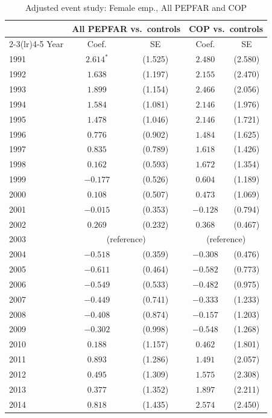 \begin{table}[htbp]
\centering
\small
\caption{Adjusted event study: Female emp., All PEPFAR and COP}
\label{tab:es_combined_emp_female}
\begin{tabular}{lcccc}
\toprule
 & \multicolumn{2}{c}{All PEPFAR vs.\ controls} & \multicolumn{2}{c}{COP vs.\ controls} \\
\cmidrule(lr){2-3}\cmidrule(lr){4-5}
Year & Coef. & SE & Coef. & SE \\
\midrule
1991 & $2.614^{*}$ & (1.525) & $2.480$ & (2.580) \\
1992 & $1.638$ & (1.197) & $2.155$ & (2.470) \\
1993 & $1.899$ & (1.154) & $2.466$ & (2.056) \\
1994 & $1.584$ & (1.081) & $2.146$ & (1.976) \\
1995 & $1.478$ & (1.046) & $2.146$ & (1.721) \\
1996 & $0.776$ & (0.902) & $1.484$ & (1.625) \\
1997 & $0.835$ & (0.789) & $1.618$ & (1.426) \\
1998 & $0.162$ & (0.593) & $1.672$ & (1.354) \\
1999 & $-0.177$ & (0.526) & $0.604$ & (1.189) \\
2000 & $0.108$ & (0.507) & $0.473$ & (1.069) \\
2001 & $-0.015$ & (0.353) & $-0.128$ & (0.794) \\
2002 & $0.269$ & (0.232) & $0.368$ & (0.467) \\
2003 & \multicolumn{2}{c}{(reference)} & \multicolumn{2}{c}{(reference)} \\
2004 & $-0.518$ & (0.359) & $-0.308$ & (0.476) \\
2005 & $-0.611$ & (0.464) & $-0.582$ & (0.773) \\
2006 & $-0.549$ & (0.533) & $-0.482$ & (0.975) \\
2007 & $-0.449$ & (0.741) & $-0.333$ & (1.233) \\
2008 & $-0.408$ & (0.874) & $-0.157$ & (1.203) \\
2009 & $-0.302$ & (0.998) & $-0.548$ & (1.268) \\
2010 & $0.188$ & (1.157) & $0.462$ & (1.801) \\
2011 & $0.893$ & (1.286) & $1.491$ & (2.057) \\
2012 & $0.495$ & (1.309) & $1.575$ & (2.308) \\
2013 & $0.377$ & (1.352) & $1.897$ & (2.211) \\
2014 & $0.818$ & (1.435) & $2.574$ & (2.450) \\

\end{tabular}
\end{table}
